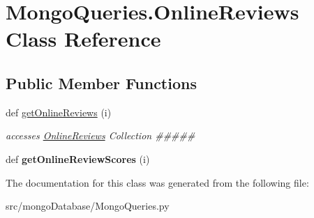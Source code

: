 \hypertarget{class_mongo_queries_1_1_online_reviews}{}\section{Mongo\+Queries.\+Online\+Reviews Class Reference}
\label{class_mongo_queries_1_1_online_reviews}
\subsection*{Public Member Functions}
\begin{DoxyCompactItemize}
\item 
\hypertarget{class_mongo_queries_1_1_online_reviews_a6f3d0736bb3e7890a007e2d4823a6d0d}{}\label{class_mongo_queries_1_1_online_reviews_a6f3d0736bb3e7890a007e2d4823a6d0d} 
def \hyperlink{class_mongo_queries_1_1_online_reviews_a6f3d0736bb3e7890a007e2d4823a6d0d}{get\+Online\+Reviews} (i)
\begin{DoxyCompactList}\small\item\em accesses \hyperlink{class_mongo_queries_1_1_online_reviews}{Online\+Reviews} Collection \#\#\#\#\# \end{DoxyCompactList}\item 
\hypertarget{class_mongo_queries_1_1_online_reviews_a87dae9b1fdb0f48556e4835d102bb398}{}\label{class_mongo_queries_1_1_online_reviews_a87dae9b1fdb0f48556e4835d102bb398} 
def {\bfseries get\+Online\+Review\+Scores} (i)
\end{DoxyCompactItemize}


The documentation for this class was generated from the following file\+:\begin{DoxyCompactItemize}
\item 
src/mongo\+Database/Mongo\+Queries.\+py\end{DoxyCompactItemize}
